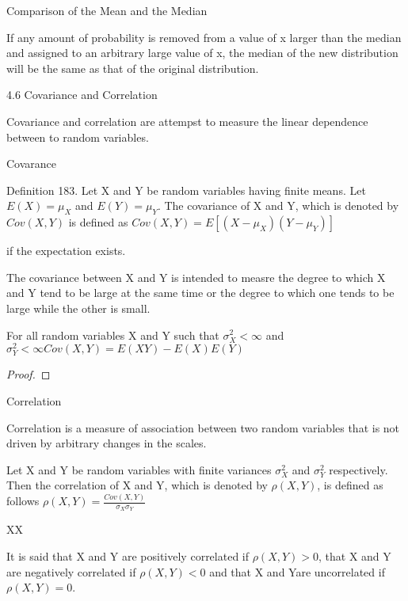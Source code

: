 Comparison of the Mean and the Median

{\color{red} If any amount of probability is removed from a value of x larger than the median and assigned to an arbitrary large value of x, the median of the new distribution will be the same as that of the original distribution.}

4.6 Covariance and Correlation

Covariance and correlation are attempst to measure the linear dependence between to random variables.

Covarance

\begin{definition}
Definition 183. Let X and Y be random variables having finite means. Let $E\left(X\right)=\mu_{X}$ and $E\left(Y\right)=\mu_{Y}$. The covariance of X and Y, which is denoted by $Cov\left(X,Y\right)$ is defined as $Cov\left(X,Y\right)=E\left[\left(X-\mu_{X}\right)\left(Y-\mu_{Y}\right)\right]$
\end{definition}

if the expectation exists.

The covariance between X and Y is intended to measre the degree to which X and Y tend to be large at the same time or the degree to which one tends to be large while the other is small.

\begin{proposition}
For all random variables X and Y such that $\sigma_{X}^{2}<\infty$ and $\sigma_{Y}^{2}<\infty Cov\left(X,Y\right)=E\left(XY\right)-E\left(X\right)E\left(Y\right)$
\end{proposition}
\begin{proof}
\end{proof}

Correlation

Correlation is a measure of association between two random variables that is not driven by arbitrary changes in the scales.

\begin{definition}
Let X and Y be random variables with finite variances $\sigma_{X}^{2}$ and $\sigma_{Y}^{2}$ respectively. Then the correlation of X and Y, which is denoted by $\rho\left(X,Y\right)$, is defined as follows $\rho\left(X,Y\right)=\frac{Cov\left(X,Y\right)}{\sigma_{X}\sigma_{Y}}$
\end{definition}

XX

\begin{definition}
It is said that X and Y are positively correlated if $\rho\left(X,Y\right)>0$, that X and Y are negatively correlated if $\rho\left(X,Y\right)<0$ and that X and Yare uncorrelated if $\rho\left(X,Y\right)=0$.
\end{definition}

